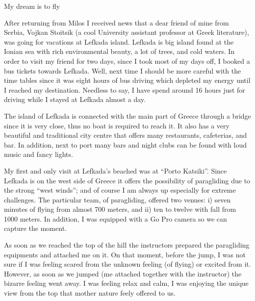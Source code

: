 \documentclass[10pt,a4paper]{article} %
\newcommand{\NewsItem}[1]{ %
\usefont{T1}{fvs}{n}{n} %
\vspace{24pt}\large #1\vspace{3pt} %
\par \normalsize \normalfont}
\begin{document}
\begin{multicols}{3}
\NewsItem{My dream is to fly}

After returning from Milos I received news that a dear friend of mine from Serbia, 
Vojkan Stoitsik (a cool University assistant professor at Greek literature), 
was going for vacations at Lefkada island. 
Lefkada is big island found at the Ionian sea with rich environmental beauty, a lot 
of trees, and cold waters.
In order to visit my friend for two days, since I took most of my days off, I 
booked a bus tickets towards Lefkada. 
Well, next time I should be more careful with the time tables since it was eight hours 
of bus driving which depleted my energy until I reached my destination. 
Needless to say, I have spend around 16 hours just for driving while I stayed at 
Lefkada almost a day. 


The island of Lefkada is connected with the main part of Greece through a bridge 
since it is very close, thus no boat is required to reach it. 
It also has a very beautiful and traditional city centre that offers many 
restaurants, cafeterias, and bar. 
In addition, next to port many bars and night clubs can be found with loud 
music and fancy lights. 


My first and only visit at Lefkada's beached was at ``Porto Katsiki''. 
Since Lefkada is on the west side of Greece it offers the possibility of 
paragliding due to the strong ``west winds''; and of course I am always up 
especially for extreme challenges. 
The particular team, of paragliding, offered two venues: i) seven minutes of flying 
from almost 700 meters, and ii) ten to twelve with fall from 1000 meters. 
In addition, I was equipped with a Go Pro camera so we can capture the moment. 


As soon as we reached the top of the hill the instructors prepared the paragliding 
equipments and attached me on it. 
On that moment, before the jump, I was not sure if I was feeling scared from the 
unknown feeling (of flying) or excited from it. 
However, as soon as we jumped (me attached together with the instructor) the 
bizarre feeling went away. 
I was feeling relax and calm, I was enjoying the unique view from the top that 
mother nature feely offered to us. 
 


\end{multicols}
\end{document}
